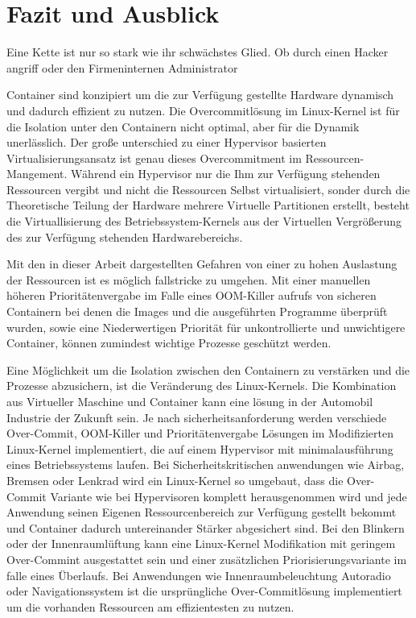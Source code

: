 \thispagestyle{empty}
\section{Fazit und Ausblick}


Eine Kette ist nur so stark wie ihr schwächstes Glied. Ob durch einen Hacker angriff oder den Firmeninternen Administrator

Container sind konzipiert um die zur Verfügung gestellte Hardware dynamisch und dadurch effizient zu nutzen. Die Overcommitlösung im Linux-Kernel ist für die Isolation unter den Containern nicht optimal, aber für die Dynamik unerlässlich. Der große unterschied zu einer Hypervisor basierten Virtualisierungsansatz ist genau dieses Overcommitment im Ressourcen-Mangement. Während ein Hypervisor nur die Ihm zur Verfügung stehenden Ressourcen vergibt und nicht die  Ressourcen Selbst virtualisiert, sonder durch die Theoretische Teilung der Hardware mehrere Virtuelle Partitionen erstellt, besteht die Virtuallisierung des Betriebssystem-Kernels aus der Virtuellen Vergrößerung des zur Verfügung stehenden Hardwarebereichs. 

Mit den in dieser Arbeit dargestellten Gefahren von einer zu hohen Auslastung der Ressourcen ist es möglich fallstricke zu umgehen. Mit einer manuellen höheren Prioritätenvergabe im Falle eines OOM-Killer aufrufs von sicheren Containern bei denen die Images und die ausgeführten Programme überprüft wurden, sowie eine Niederwertigen Priorität für unkontrollierte und unwichtigere Container, können zumindest wichtige Prozesse geschützt werden.

Eine Möglichkeit um die Isolation zwischen den Containern zu verstärken und die Prozesse abzusichern, ist die Veränderung des Linux-Kernels. Die Kombination aus Virtueller Maschine und Container kann eine lösung in der Automobil Industrie der Zukunft sein. Je nach sicherheitsanforderung werden verschiede Over-Commit, OOM-Killer und Prioritätenvergabe Lösungen im Modifizierten Linux-Kernel implementiert, die auf einem Hypervisor mit minimalausführung eines Betriebssystems laufen. Bei Sicherheitskritischen anwendungen wie Airbag, Bremsen oder Lenkrad wird ein Linux-Kernel so umgebaut, dass die Over-Commit Variante wie bei Hypervisoren komplett herausgenommen wird und jede Anwendung seinen Eigenen Ressourcenbereich zur Verfügung gestellt bekommt und Container dadurch untereinander Stärker abgesichert sind. Bei den Blinkern oder der Innenraumlüftung kann eine Linux-Kernel Modifikation mit geringem Over-Commint ausgestattet sein und einer zusätzlichen Priorisierungsvariante im falle eines Überlaufs. Bei Anwendungen wie Innenraumbeleuchtung Autoradio oder Navigationssystem ist die ursprüngliche Over-Commitlösung implementiert um die vorhanden Ressourcen am effizientesten zu nutzen.

